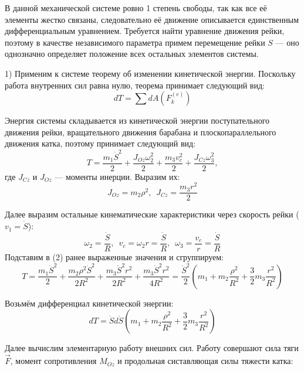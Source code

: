 \documentclass{article}
\begin{document}
В данной механической системе ровно 1 степень свободы, так как все её элементы жестко связаны, следовательно её движение описывается единственным дифференциальным уравнением. Требуется найти уравнение движения рейки, поэтому в качестве независимого параметра примем перемещение рейки $S$ --- оно однозначно определяет положение всех остальных элементов системы. \par
1) Применим к системе теорему об изменении кинетической энергии. Поскольку работа внутренних сил равна нулю, теорема принимает следующий вид:
\begin{equation}
	dT = \sum dA(F_k^{(e)})
\end{equation}
\par
Энергия системы складывается из кинетической энергии поступательного движения рейки, вращательного движения барабана и плоскопараллельного движения катка, поэтому принимает следующий вид:
\begin{equation}
	T = \frac{m_1 \dot{S}^2}{2} + \frac{J_{Oz} \omega_2^2}{2} + \frac{m_3 v_c^2}{2} + \frac{J_{Cz} \omega_3^2}{2},
\end{equation}
где $J_{Cz}$ и $J_{Oz}$ --- моменты инерции. Выразим их:
\begin{equation*}
	J_{Oz} = m_2\rho^2, \,\,\, J_{Cz} = \frac{m_3r^2}{2}
\end{equation*}
\par
Далее выразим остальные кинематические характеристики через скорость рейки ($v_1 = \dot{S}$):
\begin{equation*}
	\omega_2 = \frac{\dot{S}}{R}, \,\,\, v_c = \omega_2r = \frac{\dot{S}}{R}, \,\,\, \omega_3 = \frac{v_c}{r} = \frac{\dot{S}}{R}
\end{equation*}
\newpage
Подставим в (2) ранее выраженные значения и сгруппируем:
\begin{equation*}
	T = \frac{m_1 \dot{S}^2}{2} + \frac{m_{2} \rho^2 \dot{S}^2}{2 R^2} + \frac{m_3 \dot{S}^2 r^2}{2 R^2} + \frac{m_3 \dot{S}^2 r^2}{4 R^2} = \frac{\dot{S}^2}{2} \left( m_1 + m_{2} \frac{\rho^2}{R^2} + \frac{3}{2} m_3 \frac{r^2}{R^2} \right)
\end{equation*}
\par
Возьмём дифференциал кинетической энергии:
\begin{equation}
	dT = \dot{S} d\dot{S} \left( m_1 + m_2 \frac{\rho^2}{R^2} + \frac{3}{2} m_3 \frac{r^2}{R^2} \right)
\end{equation}
\par
Далее вычислим элементарную работу внешних сил. Работу совершают сила тяги $\vec{F}$, момент сопротивления $M_{Oz}$ и продольная систавляющая силы тяжести катка:
\end{document}
